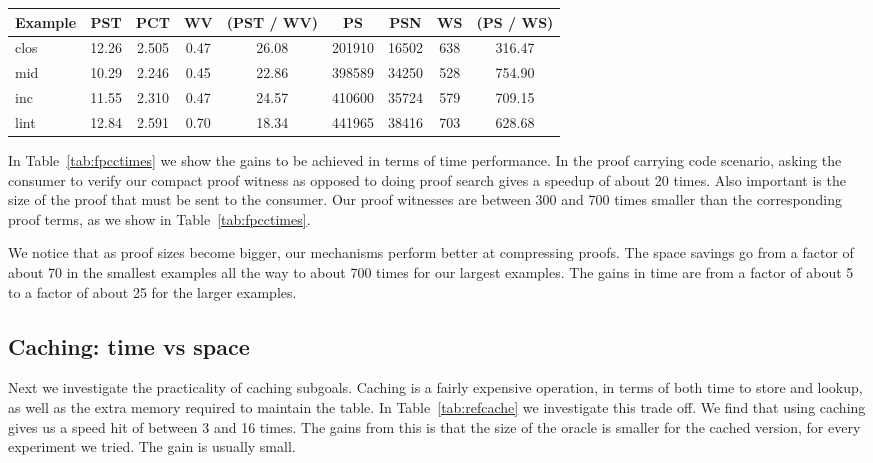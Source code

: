 \documentclass{llncs}
\begin{document}
\begin{table*}[htbp]
\begin{center}
\begin{small}
\begin{tabular}{|l|c|c|c|c|c|c|c|c|}
\hline
Example & PST & PCT & WV & (PST / WV) & PS & PSN & WS & (PS / WS)\\
\hline
clos & 12.26 & 2.505 & 0.47 & 26.08& 201910 & 16502 & 638 & 316.47\\
mid & 10.29 & 2.246 & 0.45 & 22.86& 398589 & 34250 & 528 & 754.90\\
inc & 11.55 & 2.310 & 0.47 & 24.57& 410600 & 35724 & 579 & 709.15\\
lint & 12.84 & 2.591 & 0.70 & 18.34& 441965 & 38416 & 703 & 628.68\\
\hline
\end{tabular}
\end{small}
\end{center}
\caption{\label{tab:fpcctimes}
FPCC: Times without Caching}
\end{table*}

In Table~\ref{tab:fpcctimes} we show the gains to be achieved in terms
of time performance. In the proof carrying code scenario, asking the
consumer to verify our compact proof witness as opposed to doing proof
search gives a speedup of about 20 times. Also important is the size
of the proof that must be sent to the consumer. Our proof witnesses
are between 300 and 700 times smaller than the corresponding proof
terms, as we show in Table~\ref{tab:fpcctimes}.

We notice that as proof sizes become bigger, our mechanisms perform
better at compressing proofs.  The space savings go from a factor of
about 70 in the smallest examples all the way to about 700 times for
our largest examples. The gains in time are from a factor of about 5
to a factor of about 25 for the larger examples.

\subsection{Caching: time vs space}
Next we investigate the practicality of caching subgoals. Caching is a
fairly expensive operation, in terms of both time to store and lookup,
as well as the extra memory required to maintain the table. In
Table~\ref{tab:refcache} we investigate this trade off. We find that
using caching gives us a speed hit of between 3 and 16 times. The
gains from this is that the size of the oracle is smaller for the
cached version, for every experiment we tried. The gain is usually
small.
\end{document}
